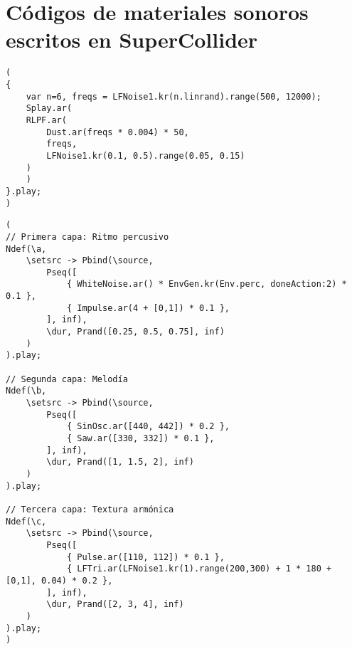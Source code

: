 \section{Códigos de materiales sonoros escritos en SuperCollider}
\label{sec:materiales_supercollider}





\begin{minipage}[t]{1\textwidth}
    \centering
    \begin{lstlisting}[style=SuperCollider-IDE, basicstyle=\footnotesize\ttfamily, numbers=none]
(
{
    var n=6, freqs = LFNoise1.kr(n.linrand).range(500, 12000);
    Splay.ar(
    RLPF.ar(
        Dust.ar(freqs * 0.004) * 50,
        freqs,
        LFNoise1.kr(0.1, 0.5).range(0.05, 0.15)
    )
    )
}.play;
)                                          
    \end{lstlisting}
    \vspace{1cm}
\end{minipage}


















\begin{minipage}[t]{1\textwidth}
    \centering
    \begin{lstlisting}[style=SuperCollider-IDE, basicstyle=\footnotesize\ttfamily, numbers=none]
(
// Primera capa: Ritmo percusivo
Ndef(\a,
    \setsrc -> Pbind(\source,
        Pseq([
            { WhiteNoise.ar() * EnvGen.kr(Env.perc, doneAction:2) * 0.1 },
            { Impulse.ar(4 + [0,1]) * 0.1 },
        ], inf),
        \dur, Prand([0.25, 0.5, 0.75], inf)
    )
).play;

// Segunda capa: Melodía
Ndef(\b,
    \setsrc -> Pbind(\source,
        Pseq([
            { SinOsc.ar([440, 442]) * 0.2 },
            { Saw.ar([330, 332]) * 0.1 },
        ], inf),
        \dur, Prand([1, 1.5, 2], inf)
    )
).play;

// Tercera capa: Textura armónica
Ndef(\c,
    \setsrc -> Pbind(\source,
        Pseq([
            { Pulse.ar([110, 112]) * 0.1 },
            { LFTri.ar(LFNoise1.kr(1).range(200,300) + 1 * 180 + [0,1], 0.04) * 0.2 },
        ], inf),
        \dur, Prand([2, 3, 4], inf)
    )
).play;
)     
    \end{lstlisting}
    \vspace{1cm}
\end{minipage}








